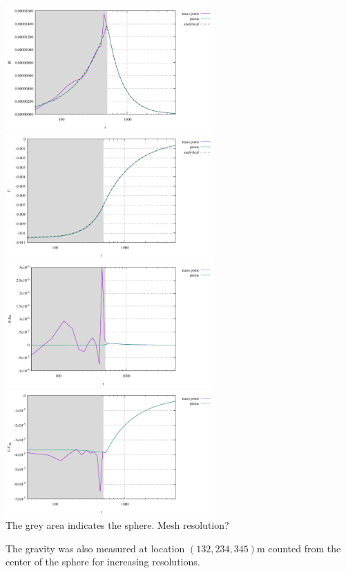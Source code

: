 \begin{center}
\includegraphics[width=8cm]{python_codes/fieldstone_84/sphere/gravnorm}
\includegraphics[width=8cm]{python_codes/fieldstone_84/sphere/gravpot}\\
\includegraphics[width=8cm]{python_codes/fieldstone_84/sphere/gravnorm_error}
\includegraphics[width=8cm]{python_codes/fieldstone_84/sphere/gravpot_error}\\
{\captionfont  The grey area indicates the sphere. Mesh resolution?}
\end{center}

The gravity was also measured at location $(132,234,345)\si{\metre}$ counted from the center of the sphere
for increasing resolutions. 

